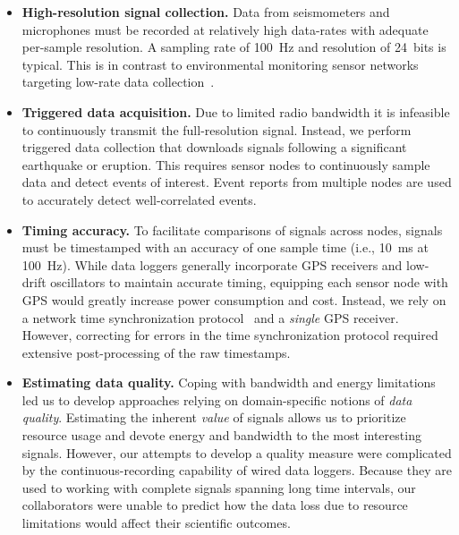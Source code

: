 \begin{itemize}

\item \textbf{High-resolution signal collection.} Data from seismometers and
microphones must be recorded at relatively high data-rates with adequate
per-sample resolution. A sampling rate of 100~Hz and resolution of 24~bits is
typical. This is in contrast to environmental monitoring sensor networks
targeting low-rate data collection~\cite{gdi-sensys04,berkeley-redwoods}.

\item \textbf{Triggered data acquisition.} Due to limited radio bandwidth it
is infeasible to continuously transmit the full-resolution signal. Instead,
we perform triggered data collection that downloads signals following a
significant earthquake or eruption. This requires sensor nodes to
continuously sample data and detect events of interest. Event reports from
multiple nodes are used to accurately detect well-correlated events.

\item \textbf{Timing accuracy.} To facilitate comparisons of signals across
nodes, signals must be timestamped with an accuracy of one sample time (i.e.,
10~ms at 100~Hz). While data loggers generally incorporate GPS receivers and
low-drift oscillators to maintain accurate timing, equipping each sensor node
with GPS would greatly increase power consumption and cost. Instead, we rely
on a network time synchronization protocol~\cite{rbs,ftsp} and a
\textit{single} GPS receiver. However, correcting for errors in the time
synchronization protocol required extensive post-processing of the raw
timestamps.

\item \textbf{Estimating data quality.} Coping with bandwidth and energy
limitations led us to develop approaches relying on domain-specific notions
of \textit{data quality}. Estimating the inherent \textit{value} of signals
allows us to prioritize resource usage and devote energy and bandwidth to the
most interesting signals. However, our attempts to develop a quality measure
were complicated by the continuous-recording capability of wired data
loggers. Because they are used to working with complete signals spanning long
time intervals, our collaborators were unable to predict how the data loss
due to resource limitations would affect their scientific outcomes.


\end{itemize}
